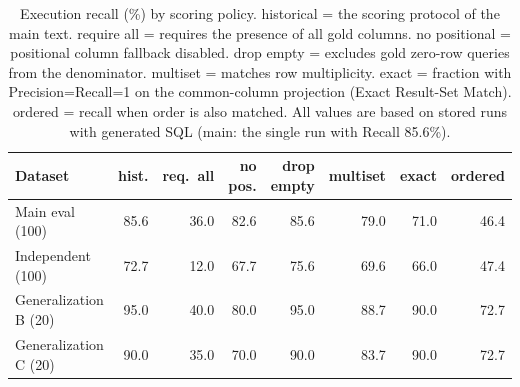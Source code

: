 \begin{table}[t]
  \centering
  \caption{Execution recall (\%) by scoring policy. historical = the scoring protocol of the main text. require all = requires the presence of all gold columns. no positional = positional column fallback disabled. drop empty = excludes gold zero-row queries from the denominator. multiset = matches row multiplicity. exact = fraction with Precision=Recall=1 on the common-column projection (Exact Result-Set Match). ordered = recall when order is also matched. All values are based on stored runs with generated SQL (main: the single run with Recall 85.6\%).}
  \label{tab:scoring_audit}
  \small
  \begin{tabular}{@{}lrrrrrrr@{}}
    \toprule
    Dataset & hist. & req.\ all & no pos. & drop empty & multiset & exact & ordered \\
    \midrule
    Main eval (100) & 85.6 & 36.0 & 82.6 & 85.6 & 79.0 & 71.0 & 46.4 \\
    Independent (100) & 72.7 & 12.0 & 67.7 & 75.6 & 69.6 & 66.0 & 47.4 \\
    Generalization B (20) & 95.0 & 40.0 & 80.0 & 95.0 & 88.7 & 90.0 & 72.7 \\
    Generalization C (20) & 90.0 & 35.0 & 70.0 & 90.0 & 83.7 & 90.0 & 72.7 \\
    \bottomrule
  \end{tabular}
\end{table}

